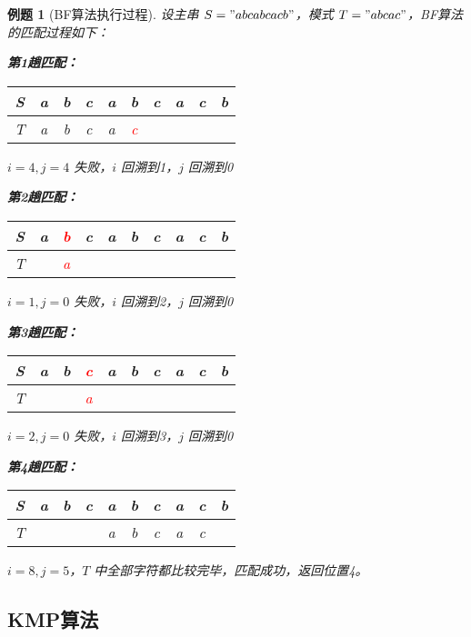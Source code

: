 \documentclass[12pt,a4paper]{amsart}
\newtheorem{example}{例题}[section]
\begin{document}
\begin{example}[BF算法执行过程]
设主串 $S = "abcabcacb"$，模式 $T = "abcac"$，BF算法的匹配过程如下：

\textbf{第1趟匹配：}
\begin{center}
\begin{tabular}{|c|c|c|c|c|c|c|c|c|c|}
\hline
S & a & b & c & a & b & c & a & c & b \\
\hline
T & a & b & c & a & \textcolor{red}{c} &  &  &  &  \\
\hline
\end{tabular}
\end{center}
$i=4, j=4$ 失败，$i$ 回溯到1，$j$ 回溯到0

\textbf{第2趟匹配：}
\begin{center}
\begin{tabular}{|c|c|c|c|c|c|c|c|c|c|}
\hline
S & a & \textcolor{red}{b} & c & a & b & c & a & c & b \\
\hline
T &  & \textcolor{red}{a} &  &  &  &  &  &  &  \\
\hline
\end{tabular}
\end{center}
$i=1, j=0$ 失败，$i$ 回溯到2，$j$ 回溯到0

\textbf{第3趟匹配：}
\begin{center}
\begin{tabular}{|c|c|c|c|c|c|c|c|c|c|}
\hline
S & a & b & \textcolor{red}{c} & a & b & c & a & c & b \\
\hline
T &  &  & \textcolor{red}{a} &  &  &  &  &  &  \\
\hline
\end{tabular}
\end{center}
$i=2, j=0$ 失败，$i$ 回溯到3，$j$ 回溯到0

\textbf{第4趟匹配：}
\begin{center}
\begin{tabular}{|c|c|c|c|c|c|c|c|c|c|}
\hline
S & a & b & c & a & b & c & a & c & b \\
\hline
T &  &  &  & a & b & c & a & c &  \\
\hline
\end{tabular}
\end{center}
$i=8, j=5$，$T$ 中全部字符都比较完毕，匹配成功，返回位置4。
\end{example}

\subsection{KMP算法}
\end{document}
